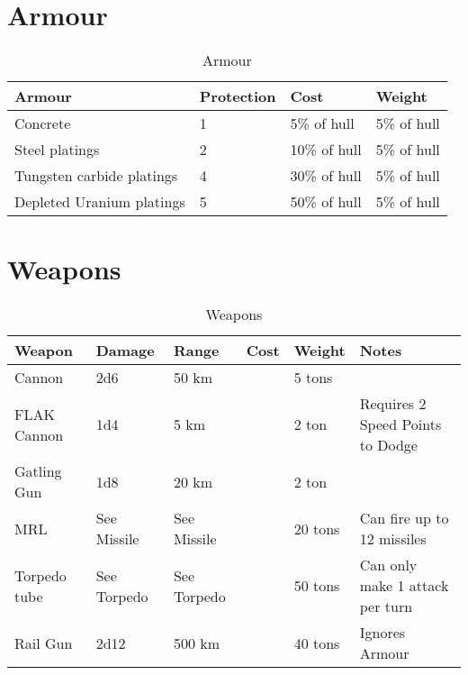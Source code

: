 \section{Armour}
\label{sec:Armour}

\begin{table}[H]
  \centering
  \caption{Armour}
  \label{tab:vessel-armour}
  \begin{tabular}{|l|l|l|l|}
    \hline
    Armour                    & Protection & Cost         & Weight      \\  \hline
    Concrete                  & 1          & 5\% of hull  & 5\% of hull \\ \hline
    Steel platings            & 2          & 10\% of hull & 5\% of hull \\ \hline
    Tungsten carbide platings & 4          & 30\% of hull & 5\% of hull \\ \hline
    Depleted Uranium platings & 5          & 50\% of hull & 5\% of hull \\ \hline
  \end{tabular}
\end{table}

\section{Weapons}
\label{sec:Weapons}

\begin{table}[H]
  \centering
  \caption{Weapons}
  \label{tab:vessel-weapons}
  \begin{tabularx}{\textwidth}{|l|l|l|l|l|X|}
    \hline
    Weapon       & Damage      & Range       & Cost & Weight  & Notes                            \\ \hline
    Cannon       & 2d6         & 50 km       & ~    & 5 tons  & ~                                \\ \hline
    FLAK Cannon  & 1d4         & 5 km        & ~    & 2 ton   & Requires 2 Speed Points to Dodge \\ \hline
    Gatling Gun  & 1d8         & 20 km       & ~    & 2 ton   & ~      \\ \hline
    MRL          & See Missile & See Missile & ~    & 20 tons & Can fire up to 12 missiles       \\ \hline
    Torpedo tube & See Torpedo & See Torpedo & ~    & 50 tons & Can only make 1 attack per turn  \\ \hline
    Rail Gun     & 2d12     & 500 km      & ~    & 40 tons & Ignores Armour                   \\ \hline
  \end{tabularx}
\end{table}

